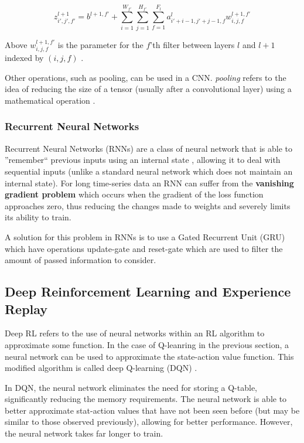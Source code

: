  \[z_{i',j',f'}^{l+1} = b^{l+1,f'} + \sum_{i=1}^{W_{f'}}\sum_{j=1}^{H_{f'}}\sum_{f=1}^{F_l}a^l_{i'+i-1,j'+j-1,f} w^{l+1,f'}_{i,j,f}
 \]
 
 Above $w^{l+1,f'}_{i,j,f}$ is the parameter for the $f$'th filter between layers $l$ and $l+1$ indexed by $(i,j,f)$ \cite{csmlnotes}.
 
 
 
Other operations, such as pooling, can be used in a CNN. \textit{pooling} refers to the idea of reducing the size of a tensor (usually after a convolutional layer) using a mathematical operation \cite{cnn}.

\subsubsection{Recurrent Neural Networks}
Recurrent Neural Networks (RNNs) are a class of neural network that is able to ''remember`` previous inputs using an internal state \cite{rnn}, allowing it to deal with sequential inputs (unlike a standard neural network which does not maintain an internal state). For long time-series data an RNN can suffer from the \textbf{vanishing gradient problem} \cite{rnn} which occurs when the gradient of the loss function approaches zero, thus reducing the changes made to weights and severely limits its ability to train. 

A solution for this problem in RNNs is to use a Gated Recurrent Unit (GRU) \cite{gru} which have operations update-gate and reset-gate which are used to filter the amount of passed information to consider. 



\subsection{Deep Reinforcement Learning and Experience Replay}

Deep RL refers to the use of neural networks within an RL algorithm to approximate some function. In the case of Q-leanring in the previous section, a neural network can be used to approximate the state-action value function. This modified algorithm is called deep Q-learning (DQN) \cite{dqn}.

In DQN, the neural network eliminates the need for storing a Q-table, significantly reducing the memory requirements. The neural network is able to better approximate stat-action values that have not been seen before (but may be similar to those observed previously), allowing for better performance. However, the neural network takes far longer to train.

